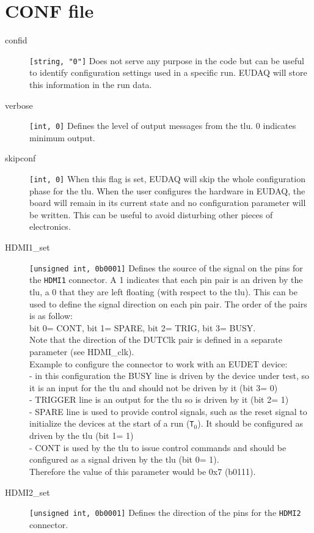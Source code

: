 \section{CONF file}
\begin{description}
  \item[confid] \verb|[string, "0"]| Does not serve any purpose in the code but can be useful to identify configuration settings used in a specific run. EUDAQ will store this information in the run data.
  \item[verbose] \verb|[int, 0]| Defines the level of output messages from the \gls{tlu}. 0 indicates minimum output.
  \item[skipconf] \verb|[int, 0]| When this flag is set, EUDAQ will skip the whole configuration phase for the \gls{tlu}. When the user configures the hardware in EUDAQ, the board will remain in its current state and no configuration parameter will be written. This can be useful to avoid disturbing other pieces of electronics.
  \item[HDMI1\_set] \verb|[unsigned int, 0b0001]| Defines the source of the signal on the pins for the \verb|HDMI1| connector. A 1 indicates that each pin pair is an driven by the \gls{tlu}, a 0 that they are left floating (with respect to the \gls{tlu}). This can be used to define the signal direction on each pin pair. The order of the pairs is as follow:\\
  bit 0= CONT, bit 1= SPARE, bit 2= TRIG, bit 3= BUSY.\\
  Note that the direction of the DUTClk pair is defined in a separate parameter (see HDMI\_clk).\\
  Example to configure the connector to work with an EUDET device:\\
  - in this configuration the BUSY line is driven by the device under test, so it is an input for the \gls{tlu} and should not be driven by it (bit 3= 0)\\
  - TRIGGER line is an output for the \gls{tlu} so is driven by it (bit 2= 1)\\
  - SPARE line is used to provide control signals, such as the reset signal to initialize the devices at the start of a run (\texttt{T$_0$}). It should be configured as driven by the \gls{tlu} (bit 1= 1)\\
  - CONT is used by the \gls{tlu} to issue control commands and should be configured as a signal driven by the \gls{tlu} (bit 0= 1).\\
  Therefore the value of this parameter would be 0x7 (b0111).
  \item[HDMI2\_set] \verb|[unsigned int, 0b0001]| Defines the direction of the pins for the \verb|HDMI2| connector.

\end{description}

